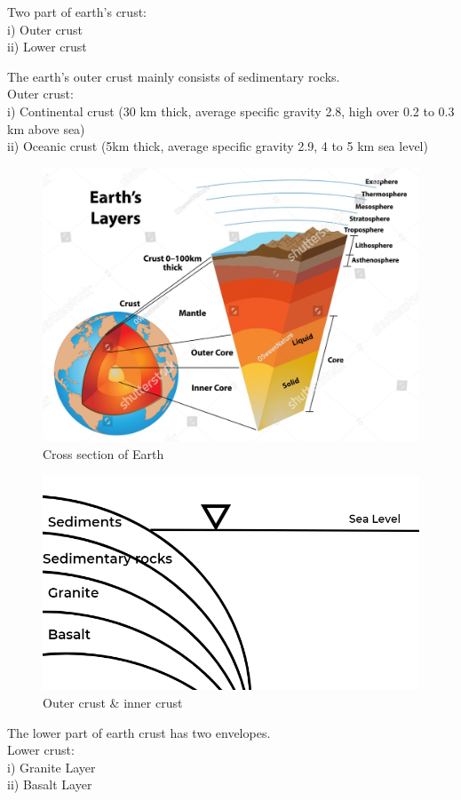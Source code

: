 \documentclass{article}
\begin{document}
Two part of earth's crust:\\
i) Outer crust \\
ii) Lower crust 

\vspace*{0.5cm}
The earth's outer crust mainly consists of sedimentary rocks. \\
Outer crust:\\
i) Continental crust (30 km thick, average specific gravity 2.8, high over 0.2 to 0.3 km above sea)\\
ii) Oceanic crust (5km thick, average specific gravity 2.9, 4 to 5 km sea level)

\begin{figure}[H]
  \begin{center}
    \includegraphics*[width=0.6\linewidth]{img/cross_section_earth.jpg}
    \caption{Cross section of Earth}
  \end{center}
\end{figure}
\begin{figure}[h]
  \begin{center}
    \includegraphics*[width=0.6\linewidth]{img/Crust.png}
    \caption{Outer crust \& inner crust} 
  \end{center}
\end{figure}

\vspace*{0.5cm}
The lower part of earth crust has two envelopes. \\
Lower crust: \\
i) Granite Layer \\
ii) Basalt Layer \\
\end{document}
